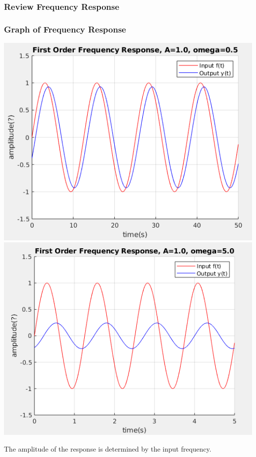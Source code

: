 \documentclass[fleqn]{beamer} %
\newcommand{\sectionIIsubsectionItitle}{Review Frequency Response}
\begin{document}
			\begin{frame}[label=sectionIIsubsectionI]
				\frametitle{\sectionIIsubsectionItitle}
				\bigskip

				\frametitle{Graph of Frequency Response}

				\small

				\includegraphics[scale=.275]{images/lecture1_fig6.png} \hspc \includegraphics[scale=.275]{images/lecture1_fig5.png}  \vspc

				The amplitude of the response is determined by the input frequency. \vspc

				\btVFill
			\end{frame}
\end{document}
